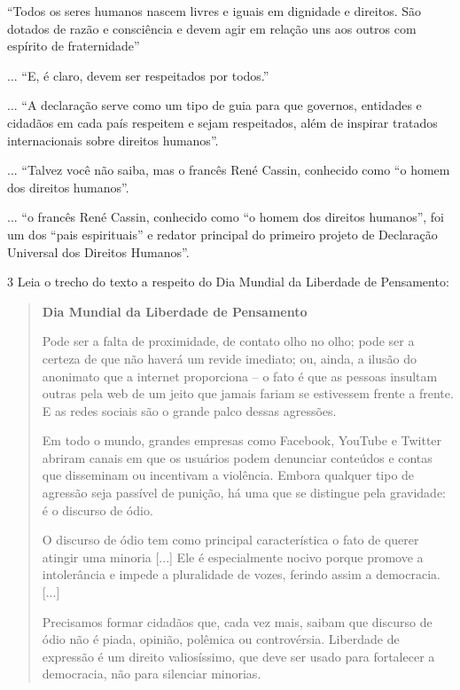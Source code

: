 \begin{boxlist}
\boxitem[\rosa{F}] ``Todos os seres humanos nascem livres e iguais em
dignidade e direitos. São dotados de razão e consciência e devem agir 
em relação uns aos outros com espírito de fraternidade''

\boxitem[\rosa{O}] ... ``E, é claro, devem ser respeitados por todos.''

\boxitem[\rosa{O}] ... ``A declaração serve como um tipo de guia para que
governos, entidades e cidadãos em cada país respeitem e sejam respeitados,
além de inspirar tratados internacionais sobre direitos humanos''.

\boxitem[\rosa{O}] ... ``Talvez você não saiba, mas o francês René Cassin,
conhecido como ``o homem dos direitos humanos''.

\boxitem[\rosa{F}] ... ``o francês René Cassin, conhecido como ``o homem 
dos direitos humanos'', foi um dos ``pais espirituais'' e redator principal do
primeiro projeto de Declaração Universal dos Direitos Humanos''.
\end{boxlist}

\num{3} Leia o trecho do texto a respeito do Dia Mundial da Liberdade de
Pensamento:

\begin{quote}
\textbf{Dia Mundial da Liberdade de Pensamento}

Pode ser a falta de proximidade, de contato olho no olho; pode ser a
certeza de que não haverá um revide imediato; ou, ainda, a ilusão do
anonimato que a internet proporciona -- o fato é que as pessoas insultam
outras pela web de um jeito que jamais fariam se estivessem frente a
frente. E as redes sociais são o grande palco dessas agressões.

Em todo o mundo, grandes empresas como Facebook, YouTube e Twitter
abriram canais em que os usuários podem denunciar conteúdos e contas que
disseminam ou incentivam a violência. Embora qualquer tipo de agressão
seja passível de punição, há uma que se distingue pela gravidade: é o
discurso de ódio.

O discurso de ódio tem como principal característica o fato de querer
atingir uma minoria {[}...{]} Ele é especialmente nocivo porque promove
a intolerância e impede a pluralidade de vozes, ferindo assim
a democracia. {[}...{]}

Precisamos formar cidadãos que, cada vez mais, saibam que discurso de
ódio não é piada, opinião, polêmica ou controvérsia. Liberdade de
expressão é um direito valiosíssimo, que deve ser usado para fortalecer
a democracia, não para silenciar minorias.

\end{quote}


